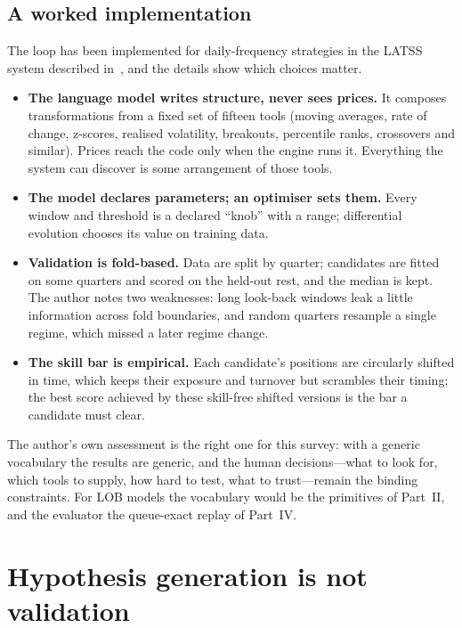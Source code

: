 \subsection{A worked implementation}

The loop has been implemented for daily-frequency strategies in the LATSS system described
in~\citet{mayeski_latss}, and the details show which choices matter.
\begin{itemize}[leftmargin=1.5em,itemsep=1pt]
\item \textbf{The language model writes structure, never sees prices.} It composes transformations from
  a fixed set of fifteen tools (moving averages, rate of change, z-scores, realised volatility,
  breakouts, percentile ranks, crossovers and similar). Prices reach the code only when the engine
  runs it. Everything the system can discover is some arrangement of those tools.
\item \textbf{The model declares parameters; an optimiser sets them.} Every window and threshold is a
  declared ``knob'' with a range; differential evolution chooses its value on training data.
\item \textbf{Validation is fold-based.} Data are split by quarter; candidates are fitted on some
  quarters and scored on the held-out rest, and the median is kept. The author notes two weaknesses:
  long look-back windows leak a little information across fold boundaries, and random quarters
  resample a single regime, which missed a later regime change.
\item \textbf{The skill bar is empirical.} Each candidate's positions are circularly shifted in time,
  which keeps their exposure and turnover but scrambles their timing; the best score achieved by
  these skill-free shifted versions is the bar a candidate must clear.
\end{itemize}
The author's own assessment is the right one for this survey: with a generic vocabulary the results
are generic, and the human decisions---what to look for, which tools to supply, how hard to test, what
to trust---remain the binding constraints. For LOB models the vocabulary would be the primitives of
Part~II, and the evaluator the queue-exact replay of Part~IV.

\section{Hypothesis generation is not validation}
\label{sec:not-validation}

